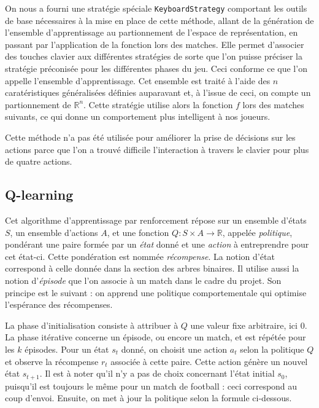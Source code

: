 \documentclass[12pt,a4paper]{article}
\begin{document}
On nous a fourni une strat\'egie sp\'eciale \texttt{KeyboardStrategy} 
comportant les outils de base n\'ecessaires \`a la mise en place de cette 
m\'ethode, allant de la g\'en\'eration de l'ensemble d'apprentissage au 
partionnement de l'espace de repr\'esentation, en passant par l'application de 
la fonction lors des matches. 
Elle permet d'associer des touches clavier aux diff\'erentes strat\'egies de 
sorte que l'on puisse pr\'eciser la strat\'egie pr\'econis\'ee pour les 
diff\'erentes phases du jeu. Ceci conforme ce que l'on appelle l'ensemble 
d'apprentissage. Cet ensemble est trait\'e \`a l'aide des $n$ carat\'eristiques 
g\'en\'eralis\'ees d\'efinies auparavant et, \`a l'issue de ceci, on compte 
un partionnement de $\mathbb{R}^n$. Cette strat\'egie utilise alors la fonction 
$f$ lors des matches suivants, ce qui donne un comportement plus intelligent 
\`a nos joueurs.

Cette m\'ethode n'a pas \'et\'e utilis\'ee pour am\'eliorer la 
prise de d\'ecisions sur les actions parce que l'on a trouv\'e difficile 
l'interaction \`a travers le clavier pour plus de quatre actions.

\subsection*{Q-learning}
Cet algorithme d'apprentissage par renforcement r\'epose sur un ensemble 
d'\'etats $S$, un ensemble d'actions $A$, et une fonction $Q: S \times A \to 
\mathbb{R}$, appel\'ee {\itshape politique}, pond\'erant une paire form\'ee 
par un {\itshape \'etat} donn\'e et une {\itshape action} \`a entreprendre pour 
cet \'etat-ci. Cette pond\'eration est nomm\'ee {\itshape r\'ecompense}. La 
notion d'\'etat correspond \`a celle donn\'ee dans la section des arbres 
binaires. Il utilise aussi la notion d'{\itshape \'episode} que l'on associe 
\`a un match dans le cadre du projet. Son principe est le suivant : on apprend 
une politique comportementale qui optimise l'esp\'erance des r\'ecompenses.

La phase d'initialisation consiste \`a attribuer \`a $Q$ une valeur fixe 
arbitraire, ici 0. La phase it\'erative concerne un \'episode, ou encore un 
match, et est r\'ep\'et\'ee pour les $k$ \'episodes. 
Pour un \'etat $s_t$ donn\'e, on choisit une action $a_t$ selon la politique $Q$ 
et observe la r\'ecompense $r_t$ associ\'ee \`a cette paire. Cette action 
g\'en\`ere un nouvel \'etat $s_{t+1}$. Il est \`a noter qu'il n'y a pas de 
choix concernant l'\'etat initial $s_0$, puisqu'il est toujours le m\^eme pour 
un match de football : ceci correspond au coup d'envoi. Ensuite, on met \`a 
jour la politique selon la formule ci-dessous.
\end{document}
